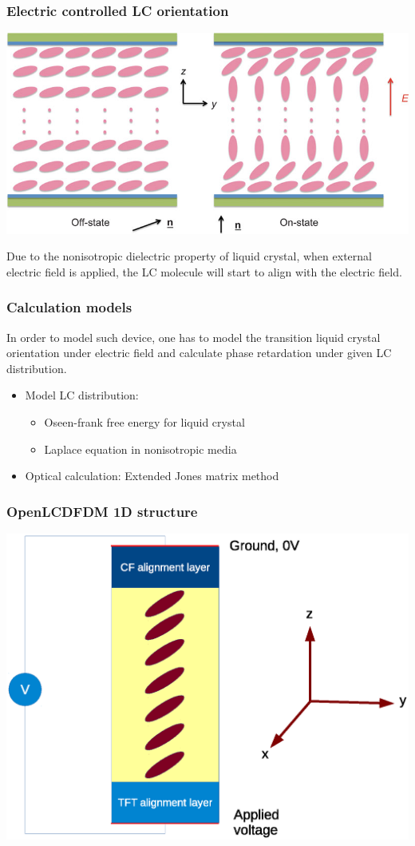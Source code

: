 \documentclass{beamer}
\begin{document}
\begin{frame}
\frametitle{Electric controlled LC orientation}
\begin{center}
\includegraphics[scale=0.4]{ECB.jpg}
\end{center}
Due to the nonisotropic dielectric property of liquid crystal, when external electric field is applied, the LC molecule will start to align with the electric field.
\end{frame}
\begin{frame}
\frametitle{Calculation models}
In order to model such device, one has to model the transition liquid crystal orientation under electric field and calculate phase retardation under given LC distribution.\\
\begin{itemize}
\item<1-> Model LC distribution:
\begin{itemize}
\item<1-> Oseen-frank free energy for liquid crystal
\item<1-> Laplace equation in nonisotropic media
\end{itemize}
\item<1-> Optical calculation: Extended Jones matrix method
\end{itemize}
\end{frame}
\begin{frame}
\frametitle{OpenLCDFDM 1D structure}
\begin{center}
\includegraphics[scale=0.4]{OneDimension_Coordinate.eps}
\end{center}
\end{frame}
\end{document}
